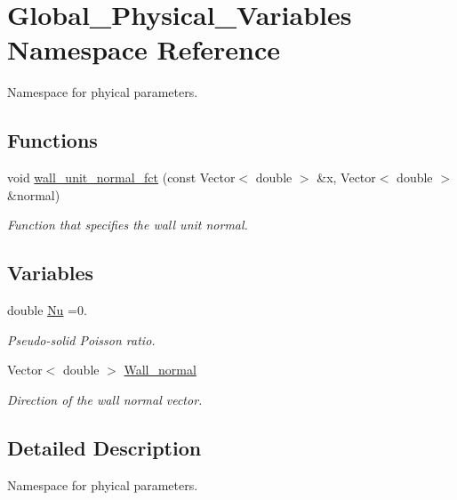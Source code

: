 \hypertarget{namespaceGlobal__Physical__Variables}{}\section{Global\+\_\+\+Physical\+\_\+\+Variables Namespace Reference}
\label{namespaceGlobal__Physical__Variables}


Namespace for phyical parameters.  


\subsection*{Functions}
\begin{DoxyCompactItemize}
\item 
void \hyperlink{namespaceGlobal__Physical__Variables_a0d48e8726fa485de2b2df2d5031ec41b}{wall\+\_\+unit\+\_\+normal\+\_\+fct} (const Vector$<$ double $>$ \&x, Vector$<$ double $>$ \&normal)
\begin{DoxyCompactList}\small\item\em Function that specifies the wall unit normal. \end{DoxyCompactList}\end{DoxyCompactItemize}
\subsection*{Variables}
\begin{DoxyCompactItemize}
\item 
double \hyperlink{namespaceGlobal__Physical__Variables_a3962c36313826b19f216f6bbbdd6a477}{Nu} =0.
\begin{DoxyCompactList}\small\item\em Pseudo-\/solid Poisson ratio. \end{DoxyCompactList}\item 
Vector$<$ double $>$ \hyperlink{namespaceGlobal__Physical__Variables_af3a3b98f9f5b354d01228884e49c5bf0}{Wall\+\_\+normal}
\begin{DoxyCompactList}\small\item\em Direction of the wall normal vector. \end{DoxyCompactList}\end{DoxyCompactItemize}


\subsection{Detailed Description}
Namespace for phyical parameters. 

